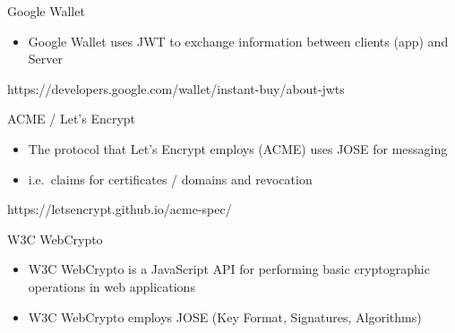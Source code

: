 \begin{frame}{Google Wallet}

\begin{itemize}
\itemsep1pt\parskip0pt
\item
  Google Wallet uses JWT to exchange information between clients (app)
  and Server
\end{itemize}

https://developers.google.com/wallet/instant-buy/about-jwts

\end{frame}

\begin{frame}{ACME / Let's Encrypt}

\begin{itemize}
\itemsep1pt\parskip0pt
\item
  The protocol that Let's Encrypt employs (ACME) uses JOSE for messaging
\item
  i.e.~claims for certificates / domains and revocation
\end{itemize}

https://letsencrypt.github.io/acme-spec/

\end{frame}

\begin{frame}{W3C WebCrypto}

\begin{itemize}
\itemsep1pt\parskip0pt
\item
  W3C WebCrypto is a JavaScript API for performing basic cryptographic
  operations in web applications
\item
  W3C WebCrypto employs JOSE (Key Format, Signatures, Algorithms)
\end{itemize}

\end{frame}
